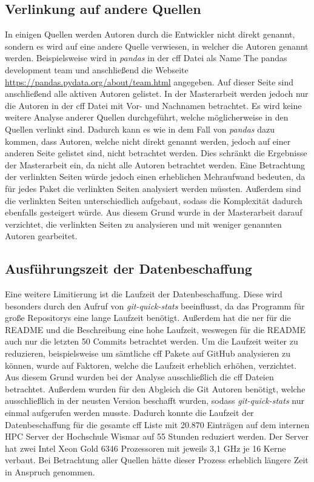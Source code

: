 \subsection*{Verlinkung auf andere Quellen}
\label{sec:verlinkung_auf_andere_quellen}
In einigen Quellen werden Autoren durch die Entwickler nicht direkt genannt, sondern es wird auf eine andere Quelle verwiesen, in welcher die Autoren genannt werden.
Beispielsweise wird in \emph{pandas} in der \gls{cff} Datei als Name \glqq The pandas development team\grqq{} und anschließend die Webseite \url{https://pandas.pydata.org/about/team.html} angegeben.
Auf dieser Seite sind anschließend alle aktiven Autoren gelistet.
In der Masterarbeit werden jedoch nur die Autoren in der \gls{cff} Datei mit Vor- und Nachnamen betrachtet.
Es wird keine weitere Analyse anderer Quellen durchgeführt, welche möglicherweise in den Quellen verlinkt sind.
Dadurch kann es wie in dem Fall von \emph{pandas} dazu kommen, dass Autoren, welche nicht direkt genannt werden, jedoch auf einer anderen Seite gelistet sind, nicht betrachtet werden.
Dies schränkt die Ergebnisse der Masterarbeit ein, da nicht alle Autoren betrachtet werden.
Eine Betrachtung der verlinkten Seiten würde jedoch einen erheblichen Mehraufwand bedeuten, da für jedes Paket die verlinkten Seiten analysiert werden müssten.
Außerdem sind die verlinkten Seiten unterschiedlich aufgebaut, sodass die Komplexität dadurch ebenfalls gesteigert würde.
Aus diesem Grund wurde in der Masterarbeit darauf verzichtet, die verlinkten Seiten zu analysieren und mit weniger genannten Autoren gearbeitet.

\subsection*{Ausführungszeit der Datenbeschaffung}
\label{sec:ausfuehrungszeit_der_datenbeschaffung}
Eine weitere Limitierung ist die Laufzeit der Datenbeschaffung.
Diese wird besonders durch den Aufruf von \emph{git-quick-stats} beeinflusst, da das Programm für große Repositorys eine lange Laufzeit benötigt.
Außerdem hat die \gls{ner} für die README und die Beschreibung eine hohe Laufzeit, weswegen für die README auch nur die letzten 50 Commits betrachtet werden.
Um die Laufzeit weiter zu reduzieren, beispielsweise um sämtliche \gls{cff} Pakete auf GitHub analysieren zu können, wurde auf Faktoren, welche die Laufzeit erheblich erhöhen, verzichtet.
Aus diesem Grund wurden bei der Analyse ausschließlich die \gls{cff} Dateien betrachtet.
Außerdem wurden für den Abgleich die Git Autoren benötigt, welche ausschließlich in der neusten Version beschafft wurden, sodass \emph{git-quick-stats} nur einmal aufgerufen werden musste.
Dadurch konnte die Laufzeit der Datenbeschaffung für die gesamte \gls{cff} Liste mit 20.870 Einträgen auf dem internen HPC Server der Hochschule Wismar auf 55 Stunden reduziert werden.
Der Server hat zwei Intel Xeon Gold 6346 Prozessoren mit jeweils 3,1 GHz je 16 Kerne verbaut.
Bei Betrachtung aller Quellen hätte dieser Prozess erheblich längere Zeit in Anspruch genommen.

